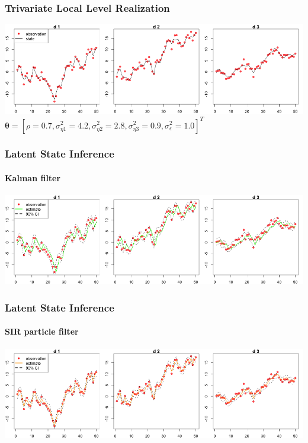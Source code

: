 \documentclass[11pt]{beamer}
\begin{document}
\begin{frame}
\frametitle{Trivariate Local Level Realization}
\centering
\includegraphics[scale=0.35]{mllm-realization-v2}\\
\bigskip
$\boldsymbol{\theta} = [\rho = 0.7, \sigma_{\eta 1}^2 = 4.2, \sigma_{\eta 2}^2 = 2.8, \sigma_{\eta 3}^2 = 0.9, \sigma_{\epsilon}^2 = 1.0]^T$
\end{frame}

\begin{frame}
\frametitle{Latent State Inference}
\framesubtitle{Kalman filter}
\centering
\includegraphics[scale=0.35]{mllm-estimate-kalman}
\end{frame}

\begin{frame}
\frametitle{Latent State Inference}
\framesubtitle{SIR particle filter}
\centering
\includegraphics[scale=0.35]{mllm-estimate-sir}
\end{frame}
\end{document}
